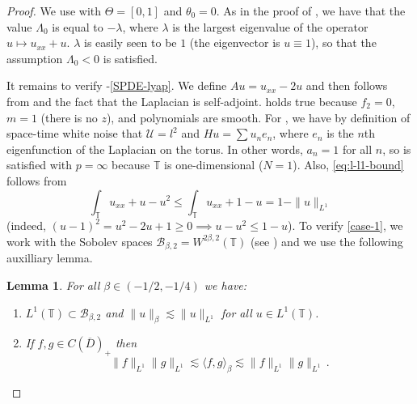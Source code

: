 \documentclass[final]{amsart}
\newtheorem{lem}[thm]{Lemma}
\numberwithin{thm}{section}
\numberwithin{equation}{section}
\newcommand{\U}{\mathcal{U}}
\newcommand{\ip}[2]{\langle #1, #2 \rangle}
\newcommand{\T}{\mathbb{T}}
\newcommand{\B}{\mathcal{B}}
\newcommand{\cdom}{C(\overline D)_+}
\begin{document}
\begin{proof}
    
We use  with $\Theta = [0,1]$ and $\theta_0 = 0$. As in the proof of , we have that the value $\Lambda_0$ is equal to $-\lambda$, where $\lambda$ is the largest eigenvalue of the operator $u \mapsto u_{xx} + u$. $\lambda$ is easily seen to be $1$ (the eigenvector is $u \equiv 1$), so that the assumption $\Lambda_0 < 0$ is satisfied.

It remains to verify -\ref{SPDE-lyap}. We define $Au = u_{xx} - 2u$ and then  follows from  and the fact that the Laplacian is self-adjoint.  holds true because $f_2 = 0$, $m=1$ (there is no $z$), and polynomials are smooth. For , we have by definition of space-time white noise that $\U = l^2$ and $Hu = \sum u_ne_n$, where $e_n$ is the $n$th eigenfunction of the Laplacian on the torus. In other words, $a_n = 1$ for all $n$, so  is satisfied with $p = \infty$ because $\T$ is one-dimensional ($N=1$). Also, \eqref{eq:l-l1-bound} follows from
$$
\int_\T u_{xx} + u - u^2 \leq \int_\T u_{xx} + 1-u= 1 - \|u\|_{L^1}
$$
(indeed, $(u-1)^2 = u^2 - 2u + 1 \geq 0 \implies u - u^2 \leq 1 - u$).
To verify \ref{case-1}, we work with the Sobolev spaces $\B_{\beta,2} = W^{2\beta,2}(\T)$ (see ) and we use the following auxilliary lemma.



\begin{lem}\label{l1-lemma}
    For all $\beta \in (-1/2,-1/4)$ we have: \begin{enumerate}[label=(\roman*)]
        \item \label{l1-in-h-beta} $L^1(\T) \subset \B_{\beta,2}$ and $\|u\|_\beta \lesssim \|u\|_{L^1}$ for all $u \in L^1(\T)$.
        \item \label{l1-times-l1} If $f,g \in \cdom$ then
        $$\|f\|_{L^1}\|g\|_{L^1} \lesssim \ip{f}{g}_\beta \lesssim \|f\|_{L^1}\|g\|_{L^1} \,.$$
    \end{enumerate}
\end{lem}


\end{proof}
\end{document}
